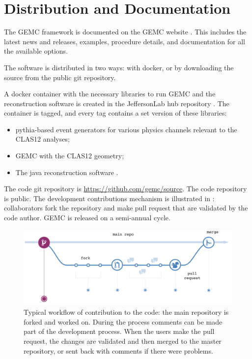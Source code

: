 \section{Distribution and Documentation}

The GEMC framework is documented on the GEMC website \cite{gemc}. This includes the latest news and releases,
examples, procedure details, and documentation for all the available options.

The software is distributed in two ways: with docker, or by downloading the source from the public git repository.


A docker container with the necessary libraries to run GEMC and the reconstruction software
is created in the JeffersonLab hub repository \cite{jlabDocker}.
The container is tagged, and every tag contains a set version of these libraries:

\begin{itemize}
	\item pythia-based event generators for various physics channels relevant to the CLAS12 analyses;
	\item GEMC with the CLAS12 geometry;
	\item The java reconstruction software \cite{reco2019}.
\end{itemize}


The code git repository is \url{https://github.com/gemc/source}.
The code repository is public. The development contributions mechanism is illustrated in : collaborators fork the repository
and make pull request that are validated by the code author.
GEMC is released on a semi-annual cycle.

\begin{figure}
	\centering
	\includegraphics[width=0.99\columnwidth,keepaspectratio]{img/github.png}
	\caption{Typical workflow of contribution to the code: the main repository is forked and worked on. During the process comments
             can be made part of the development process. When the users make the pull request, the changes are validated and then merged
             to the master repository, or sent back with comments if there were problems.}
	\label{fig:github}
\end{figure}


